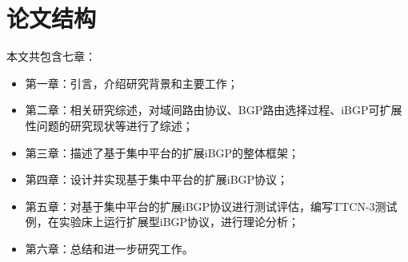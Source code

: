 \section{论文结构}
本文共包含七章：
\begin{itemize}
\item 第一章：引言，介绍研究背景和主要工作；
\item 第二章：相关研究综述，对域间路由协议、BGP路由选择过程、iBGP可扩展性问题的研究现状等进行了综述；
\item 第三章：描述了基于集中平台的扩展iBGP的整体框架；
\item 第四章：设计并实现基于集中平台的扩展iBGP协议；
\item 第五章：对基于集中平台的扩展iBGP协议进行测试评估，编写TTCN-3测试例，在实验床上运行扩展型iBGP协议，进行理论分析；
\item 第六章：总结和进一步研究工作。
\end{itemize}
